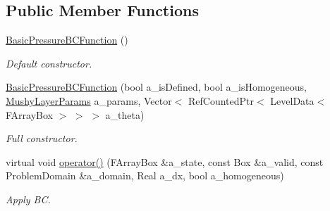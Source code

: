 \subsection*{Public Member Functions}
\begin{DoxyCompactItemize}
\item 
\hypertarget{class_basic_pressure_b_c_function_aa7dc8b5320567833c200b65b668a5302}{\hyperlink{class_basic_pressure_b_c_function_aa7dc8b5320567833c200b65b668a5302}{Basic\-Pressure\-B\-C\-Function} ()}\label{class_basic_pressure_b_c_function_aa7dc8b5320567833c200b65b668a5302}

\begin{DoxyCompactList}\small\item\em Default constructor. \end{DoxyCompactList}\item 
\hypertarget{class_basic_pressure_b_c_function_aff0d91afdc797c0d253a747cd34e123d}{\hyperlink{class_basic_pressure_b_c_function_aff0d91afdc797c0d253a747cd34e123d}{Basic\-Pressure\-B\-C\-Function} (bool a\-\_\-is\-Defined, bool a\-\_\-is\-Homogeneous, \hyperlink{class_mushy_layer_params}{Mushy\-Layer\-Params} a\-\_\-params, Vector$<$ Ref\-Counted\-Ptr$<$ Level\-Data$<$ F\-Array\-Box $>$ $>$ $>$ a\-\_\-theta)}\label{class_basic_pressure_b_c_function_aff0d91afdc797c0d253a747cd34e123d}

\begin{DoxyCompactList}\small\item\em Full constructor. \end{DoxyCompactList}\item 
\hypertarget{class_basic_pressure_b_c_function_a944fde5ba556caf5f590972b60926fd2}{virtual void \hyperlink{class_basic_pressure_b_c_function_a944fde5ba556caf5f590972b60926fd2}{operator()} (F\-Array\-Box \&a\-\_\-state, const Box \&a\-\_\-valid, const Problem\-Domain \&a\-\_\-domain, Real a\-\_\-dx, bool a\-\_\-homogeneous)}\label{class_basic_pressure_b_c_function_a944fde5ba556caf5f590972b60926fd2}

\begin{DoxyCompactList}\small\item\em Apply B\-C. \end{DoxyCompactList}\end{DoxyCompactItemize}
